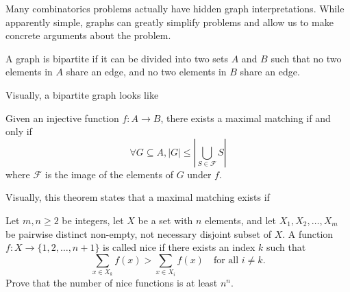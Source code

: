 \documentclass[11pt]{scrartcl}
\theoremstyle{plain} %
\theoremstyle{definition}
\theoremstyle{remark}
\theoremstyle{empty}
\theoremstyle{empty}
\theoremstyle{empty}
\theoremstyle{empty}
\theoremstyle{empty}
\theoremstyle{empty}
\begin{document}
Many combinatorics problems actually have hidden graph interpretations. While apparently simple, graphs can greatly simplify problems and allow us to make concrete arguments about the problem.

\begin{definition}[Bipartite]
A graph is bipartite if it can be divided into two sets $A$ and $B$ such that no two elements in $A$ share an edge, and no two elements in $B$ share an edge. 
\end{definition}

Visually, a bipartite graph looks like

\begin{theorem}
Given an injective function $f: A \to B$, there exists a maximal matching if and only if \[\forall G \subseteq A, |G| \le |\bigcup_{S\in \mathcal{F}} S|\] where $\mathcal{F}$ is the image of the elements of $G$ under $f$. 
\end{theorem}

Visually, this theorem states that a maximal matching exists if 

\begin{problem}[2022 ISL C5]
Let $m,n \geqslant 2$ be integers, let $X$ be a set with $n$ elements, and let $X_1,X_2,\ldots,X_m$ be pairwise distinct non-empty, not necessary disjoint subset of $X$. A function $f \colon X \to \{1,2,\ldots,n+1\}$ is called nice if there exists an index $k$ such that\[\sum_{x \in X_k} f(x)>\sum_{x \in X_i} f(x) \quad \text{for all } i \ne k.\]Prove that the number of nice functions is at least $n^n$.
\end{problem}
\end{document}
